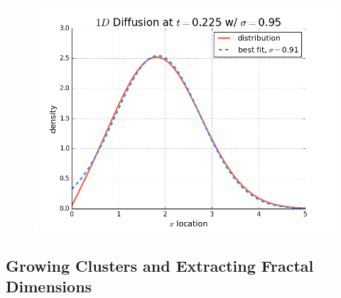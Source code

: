 \documentclass[12pt]{article}
\begin{document}
\begin{figure}[!htb]
  \caption{}\label{fig:probdensity5}
\endminipage\hfill
{}
  \includegraphics[width=\linewidth]{probdensityt2000.png}
  \caption{}\label{fig:probdensity6}
\endminipage\hfill
\end{figure}

\subsection{Growing Clusters and Extracting Fractal Dimensions}
\label{sec:clustersandfractals}
\end{document}
